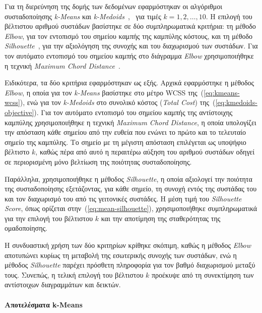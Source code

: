 Για τη διερεύνηση της δομής των δεδομένων εφαρμόστηκαν οι αλγόριθμοι συσταδοποίησης \textenglish{\textit{k-Means}} και \textenglish{\textit{k-Medoids}}~\cite{macqueen1967some},~\cite{kaufman2009finding} για τιμές \(k = 1,2,\ldots,10\). Η επιλογή του βέλτιστου αριθμού συστάδων βασίστηκε σε δύο συμπληρωματικά κριτήρια: τη μέθοδο \textenglish{\textit{Elbow}}, για τον εντοπισμό του σημείου καμπής της καμπύλης κόστους, και τη μέθοδο \textenglish{\textit{Silhouette}}~\cite{ROUSSEEUW198753}, για την αξιολόγηση της συνοχής και του διαχωρισμού των συστάδων. Για τον αυτόματο εντοπισμό του σημείου καμπής στο διάγραμμα \textenglish{\textit{Elbow}} χρησιμοποιήθηκε η τεχνική \textenglish{\textit{Maximum Chord Distance}}~\cite{Satopaa2011Kneedle}.

Ειδικότερα, τα δύο κριτήρια εφαρμόστηκαν ως εξής. Αρχικά εφαρμόστηκε η μέθοδος \textenglish{\textit{Elbow}}, η οποία για τον \textenglish{\textit{k-Means}} βασίστηκε στο μέτρο \textenglish{WCSS} της~(\ref{eq:kmeans-wcss}), ενώ για τον \textenglish{\textit{k-Medoids}} στο συνολικό κόστος (\textenglish{\textit{Total Cost}}) της~(\ref{eq:kmedoids-objective}). Για τον αυτόματο εντοπισμό του σημείου καμπής της αντίστοιχης καμπύλης χρησιμοποιήθηκε η τεχνική \textenglish{\textit{Maximum Chord Distance}}, η οποία υπολογίζει την απόσταση κάθε σημείου από την ευθεία που ενώνει το πρώτο και το τελευταίο σημείο της καμπύλης. Το σημείο με τη μέγιστη απόσταση επιλέγεται ως υποψήφιο βέλτιστο \(k\), καθώς πέρα από αυτό η περαιτέρω αύξηση του αριθμού συστάδων οδηγεί σε περιορισμένη μόνο βελτίωση της ποιότητας συσταδοποίησης.

Παράλληλα, χρησιμοποιήθηκε η μέθοδος \textenglish{\textit{Silhouette}}, η οποία αξιολογεί την ποιότητα της συσταδοποίησης εξετάζοντας, για κάθε σημείο, τη συνοχή εντός της συστάδας του και τον διαχωρισμό του από τις γειτονικές συστάδες. Η μέση τιμή του \textenglish{\textit{Silhouette Score}}, όπως ορίζεται στην~(\ref{eq:mean-silhouette}), χρησιμοποιήθηκε συμπληρωματικά για την επιλογή του βέλτιστου \(k\) και την αποτίμηση της σταθερότητας της ομαδοποίησης.

Η συνδυαστική χρήση των δύο κριτηρίων κρίθηκε σκόπιμη, καθώς η μέθοδος \textenglish{\textit{Elbow}} αποτυπώνει κυρίως τη μεταβολή της εσωτερικής συνοχής των συστάδων, ενώ η μέθοδος \textenglish{\textit{Silhouette}} παρέχει πρόσθετη πληροφορία για τον βαθμό διαχωρισμού μεταξύ τους. Συνεπώς, η τελική επιλογή του βέλτιστου \(k\) προέκυψε από τη συνεκτίμηση των αντίστοιχων διαγραμμάτων και δεικτών.

\paragraph{Αποτελέσματα k-Means}

